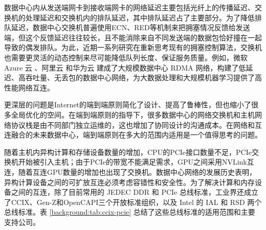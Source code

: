 数据中心内从发送端网卡到接收端网卡的网络延迟主要包括光纤上的传播延迟、交换机的处理延迟和交换机内的排队延迟，其中排队延迟占了主要部分。为了降低排队延迟，数据中心交换机普遍使用ECN、RED等机制来把拥塞情况反馈给发送端，但这个反馈延迟往往较长，且不能消除来自不同发送端的数据包恰好撞在一起导致的偶发排队。为此，近期一系列研究在重新思考现有的拥塞控制算法，交换机也需要更灵活的动态控制来尽可能降低队列长度、保证服务质量。例如，微软 Azure 云 \cite{guo2016rdma}、阿里云 \cite{aliyun-rdma} 和华为云 \cite{huawei-lossless} 建成了大规模数据中心 RDMA 网络，构建了低延迟、高吞吐量、无丢包的数据中心网络，为大数据处理和大规模机器学习提供了高性能网络互连。

更深层的问题是Internet的端到端原则简化了设计、提高了鲁棒性，但也缩小了很多全局优化的空间。在端到端原则的指导下，很多数据中心的网络交换机和主机网络协议栈是由不同部门独立运维的，这也增加了协同设计的沟通成本。在网络和互连融合的未来数据中心，端到端原则在多大的范围内适用是一个值得思考的问题。

随着主机内异构计算和存储设备数量的增加，CPU的PCIe接口数量不足，PCIe交换机开始被引入主机；由于PCIe的带宽不能满足需求，GPU之间采用NVLink互连，随着互连GPU数量的增加也出现了交换机。数据中心网络的发展历史表明，异构计算设备之间的可扩放互连必须考虑容错性和安全性。为了解决计算和内存设备之间的互连，除了目前常用的 JEDEC DDR 和 PCIe 总线标准，工业界还成立了CCIX、Gen-Z和OpenCAPI三个开放标准组织，以及 Intel 的 IAL 和 RSD 两个总线标准。表 \ref{background:tab:ccix-pcie} 总结了这些总线标准的适用范围和主要支持公司。

\begin{table}[htbp]
	\centering
	\caption{总线标准的适用范围和主要支持公司}
	\label{background:tab:ccix-pcie}
\end{table}

